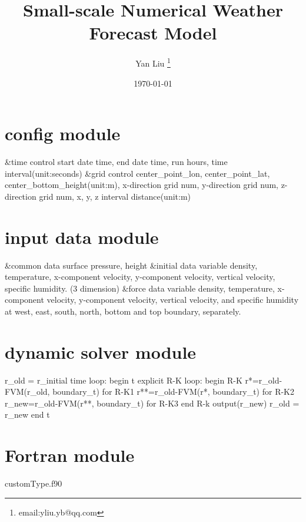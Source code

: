 \documentclass[12pt, letterpaper, twoside]{article}
\title{Small-scale Numerical Weather Forecast Model}
\author{Yan Liu \thanks{email:yliu.yb@qq.com}}
\date{\today}
\begin{document}
\maketitle
\newpage
\section*{config module}
\&time control
\newline 
start date time, 
end date time, 
run hours, 
time interval(unit:seconds)
\newline
\&grid control
\newline
center\_point\_lon, 
center\_point\_lat,
center\_bottom\_height(unit:m), 
x-direction grid num,
y-direction grid num,
z-direction grid num,
x, y, z interval distance(unit:m)

\section*{input data module}
\&common data
\newline
surface pressure,
height
\newline
\&initial data variable 
\newline 
density, 
temperature, 
x-component velocity,
y-component velocity, 
vertical velocity,
specific humidity. (3 dimension)
\newline
\&force data variable
\newline 
density, 
temperature, 
x-component velocity,
y-component velocity, 
vertical velocity,
and specific humidity 
at 
west, 
east, 
south, 
north, 
bottom and top boundary, separately.
\section*{dynamic solver module}
r\_old = r\_initial
\newline
time loop:
\newline
begin t
\newline
\hspace*{5mm}explicit R-K loop:
\newline
\hspace*{5mm}begin R-K
\newline
\hspace*{10mm}r*=r\_old-FVM(r\_old, boundary\_t) for R-K1
\newline
\hspace*{10mm}r**=r\_old-FVM(r*, boundary\_t) for R-K2
\newline
\hspace*{10mm}r\_new=r\_old-FVM(r**, boundary\_t) for R-K3
\newline
\hspace*{5mm}end R-k
\newline
\hspace*{5mm}output(r\_new)
\newline
\hspace*{5mm}r\_old = r\_new
\newline
end t
\section*{Fortran module}
customType.f90
\end{document}
